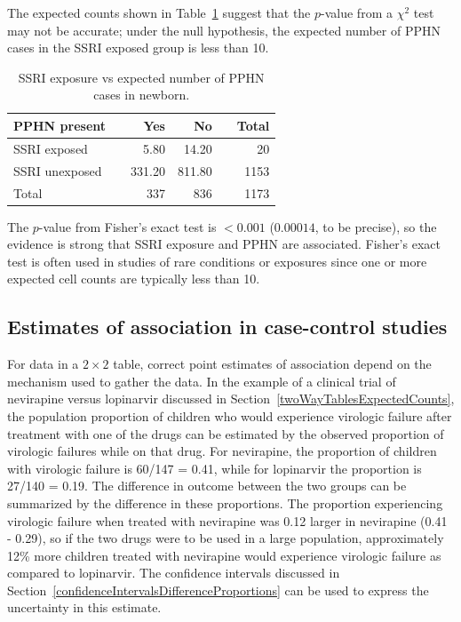 The expected counts shown in Table~\ref{ssriPPHNExpected} suggest that the $p$-value from a $\chi^2$ test may not be accurate; under the null hypothesis, the expected number of PPHN cases in the SSRI exposed group is less than 10.

 \begin{table}[h]
	\centering
	\begin{tabular}{ll rrr r}
		\hline
		PPHN present  & \hspace{2mm} & Yes & No & \hspace{2mm} & Total \\
		\hline
		SSRI exposed &	& 5.80 & 14.20 &  & 20  \\
		SSRI unexposed & & 331.20 & 811.80 &  & 1153  \\
        Total & & 337 & 836 & & 1173 \\
		\hline
	\end{tabular}
    \caption{SSRI exposure vs expected number of PPHN cases in newborn.}
    \label{ssriPPHNExpected}
\end{table}	

The $p$-value from Fisher's exact test is $< 0.001$ ($0.00014$, to be precise), so the evidence is strong that SSRI exposure and PPHN are associated. Fisher's exact test is often used in studies of rare conditions or exposures since one or more expected cell counts are typically less than 10.


\subsection{Estimates of association in case-control studies}

\label{caseControlStudiesEstimates}


For data in a $2 \times 2$ table, correct point estimates of association depend on the mechanism used to gather the data.  In the example of a clinical trial of nevirapine versus lopinarvir discussed in Section~\ref{twoWayTablesExpectedCounts}, the population proportion of children who would experience virologic failure after treatment with one of the drugs can be estimated by the observed proportion of virologic failures while on that drug. For nevirapine, the proportion of children with virologic failure is 60/147 = 0.41, while for lopinarvir the proportion is 27/140 = 0.19.  The difference in outcome between the two groups can be summarized by the difference in these proportions. The proportion experiencing virologic failure when treated with nevirapine was 0.12 larger in nevirapine (0.41 - 0.29), so if the two drugs were to be used in a large population, approximately 12\% more children treated with nevirapine would experience virologic failure as compared to lopinarvir. The confidence intervals discussed in Section~\ref{confidenceIntervalsDifferenceProportions} can be used to express the uncertainty in this estimate.

